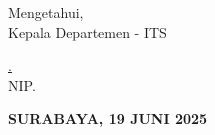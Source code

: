 \begin{center}
  Mengetahui, \\
  Kepala Departemen \namaDepartemen \namaFakultas - ITS\\

  \vspace{8ex}

  \underline{\namaKaDep.} \\
  NIP. \nipKaDep
\end{center}

\begin{center}
  \textbf{\MakeUppercase{Surabaya, 19 Juni 2025}}
\end{center}
\endgroup
